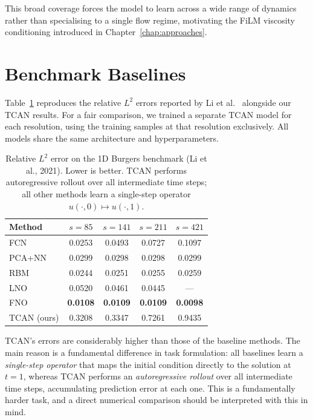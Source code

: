 This broad coverage forces the model to learn across a wide range of
dynamics rather than specialising to a single flow regime, motivating the
FiLM viscosity conditioning introduced in Chapter~\ref{chap:approaches}.

\section{Benchmark Baselines}
\label{sec:baselines}

Table~\ref{tab:fno-baselines} reproduces the relative $L^2$ errors
reported by Li et al.\ \cite{li2021fourier} alongside our TCAN results.
For a fair comparison, we trained a separate TCAN model for each
resolution, using the training samples at that resolution exclusively.
All models share the same architecture and hyperparameters.

\begin{table}[h]
  \centering
  \caption{Relative $L^2$ error on the 1D Burgers benchmark
           (Li et al., 2021). Lower is better.
           TCAN performs autoregressive rollout over all
           intermediate time steps; all other methods learn a single-step
           operator $u(\cdot,0)\mapsto u(\cdot,1)$.}
  \label{tab:fno-baselines}
  \begin{tabular}{@{}lcccc@{}}
    \toprule
    Method & $s=85$ & $s=141$ & $s=211$ & $s=421$ \\
    \midrule
    FCN    & 0.0253 & 0.0493 & 0.0727 & 0.1097 \\
    PCA+NN & 0.0299 & 0.0298 & 0.0298 & 0.0299 \\
    RBM    & 0.0244 & 0.0251 & 0.0255 & 0.0259 \\
    LNO    & 0.0520 & 0.0461 & 0.0445 & ---    \\
    FNO    & \textbf{0.0108} & \textbf{0.0109} & \textbf{0.0109} & \textbf{0.0098} \\
    \midrule
    TCAN (ours) & 0.3208 & 0.3347 & 0.7261 & 0.9435 \\
    \bottomrule
  \end{tabular}
\end{table}

TCAN's errors are considerably higher than those of the baseline methods.
The main reason is a fundamental difference in task formulation: all
baselines learn a \emph{single-step operator} that maps the initial
condition directly to the solution at $t=1$, whereas TCAN performs an
\emph{autoregressive rollout} over all intermediate time steps,
accumulating prediction error at each one. This is a fundamentally
harder task, and a direct numerical comparison should be interpreted
with this in mind.

